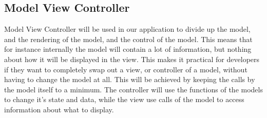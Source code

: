 \subsection{Model View Controller}
Model View Controller \cite{wiki:mvc} will be used in our application to divide up the model, and the rendering of the model, and the control of the model. This means that for instance internally the model will contain a lot of information, but nothing about how it will be displayed in the view. This makes it practical for developers if they want to completely swap out a view, or controller of a model, without having to change the model at all. This will be achieved by keeping the calls by the model itself to a minimum. The controller will use the functions of the models to change it's state and data, while the view use calls of the model to access information about what to display.
